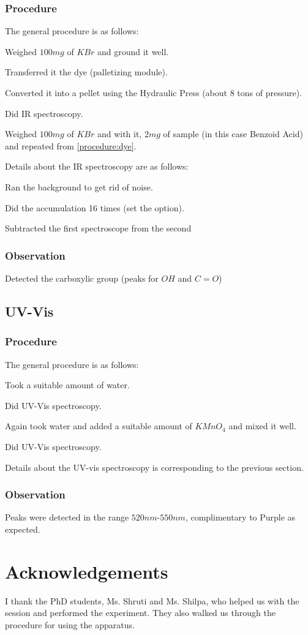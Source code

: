 	\subsubsection*{Procedure}
		The general procedure is as follows:
		\begin{aenumerate}
			\item Weighed $100mg$ of $KBr$ and ground it well.
			\item Transferred it the dye (palletizing module). \label{procedure:dye}
			\item Converted it into a pellet using the Hydraulic Press (about 8 tons of pressure).
			\item Did IR spectroscopy.
			\item Weighed $100mg$ of $KBr$ and with it, $2mg$ of sample (in this case Benzoid Acid) and repeated from \autoref{procedure:dye}.
		\end{aenumerate}
		Details about the IR spectroscopy are as follows:
		\begin{aenumerate}		
			\item Ran the background to get rid of noise.
			\item Did the accumulation 16 times (set the option).
			\item Subtracted the first spectroscope from the second
		\end{aenumerate}

	\subsubsection*{Observation}
		Detected the carboxylic group (peaks for $OH$ and $C=O$)
\subsection{UV-Vis}
	\subsubsection*{Procedure}
		The general procedure is as follows:
		\begin{aenumerate}
			\item Took a suitable amount of water.
			\item Did UV-Vis spectroscopy.
			\item Again took water and added a suitable amount of $KMnO_{4}$ and mixed it well.
			\item Did UV-Vis spectroscopy.
		\end{aenumerate}
		Details about the UV-vis spectroscopy is corresponding to the previous section.
	\subsubsection*{Observation}
		Peaks were detected in the range $520nm$-$550nm$, complimentary to Purple as expected.
\section{Acknowledgements}
I thank the PhD students, Ms. Shruti and Ms. Shilpa, who helped us with the session and performed the experiment. They also walked us through the procedure for using the apparatus.